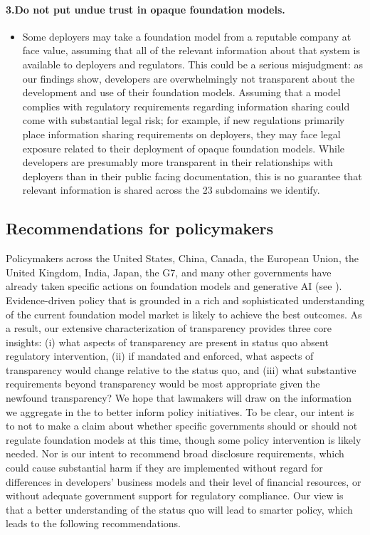  \paragraph{3.\phantom{X}Do not put undue trust in opaque foundation models.} 
    \begin{itemize}
        \item Some deployers may take a foundation model from a reputable company at face value, assuming that all of the relevant information about that system is available to deployers and regulators. 
        This could be a serious misjudgment: as our findings show, developers are overwhelmingly not transparent about the development and use of their foundation models. 
        Assuming that a model complies with regulatory requirements regarding information sharing could come with substantial legal risk; for example, if new regulations primarily place information sharing requirements on deployers, they may face legal exposure related to their deployment of opaque foundation models. 
        While developers are presumably more transparent in their relationships with deployers than in their public facing documentation, this is no guarantee that relevant information is shared across the 23 subdomains we identify.
    \end{itemize}
\clearpage
\hypertarget{recommendations-policy}{\subsection{Recommendations for policymakers}}
\label{sec:recommendations-policy}

Policymakers across the United States, China, Canada, the European Union, the United Kingdom, India, Japan, the G7, and many other governments have already taken specific actions on foundation models and generative AI (see ).
Evidence-driven policy that is grounded in a rich and sophisticated understanding of the current foundation model market is likely to achieve the best outcomes.
As a result, our extensive characterization of transparency provides three core insights: (i) what aspects of transparency are present in status quo absent regulatory intervention, (ii) if mandated and enforced, what aspects of transparency would change relative to the status quo, and (iii) what substantive requirements beyond transparency would be most appropriate given the newfound transparency?
We hope that lawmakers will draw on the information we aggregate in the \projectname to better inform policy initiatives.
To be clear, our intent is to not to make a claim about whether specific governments should or should not regulate foundation models at this time, though some policy intervention is likely needed. 
Nor is our intent to recommend broad disclosure requirements, which could cause substantial harm if they are implemented without regard for differences in developers' business models and their level of financial resources, or without adequate government support for regulatory compliance.
Our view is that a better understanding of the status quo will lead to smarter policy, which leads to the following recommendations.

